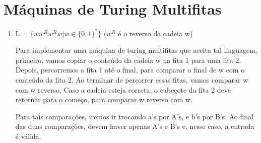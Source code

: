 \section{Máquinas de Turing Multifitas}

\begin{enumerate}[label=(\alph*)]

\item L = $\{ww^Rw^Rw \vert w \in \{0,1\}^*\}$  ($w^R$ é o reverso da cadeia w)

Para implementar uma máquina de turing multifitas que aceita tal linguagem, primeiro,
vamos copiar o conteúdo da cadeia w na fita 1 para uma fita 2. Depois,
percorremos a fita 1 até o final, para comparar o final de w com o conteúdo da fita 2. 
Ao terminar de percorrer essas fitas, vamos comparar w com w reverso. Caso a cadeia esteja
correta, o cabeçote da fita 2 deve retornar para o começo, para comparar w reverso com w.

Para tais comparações, iremos ir trocando a's por A's, e b's por B's. Ao final das duas comparações,
devem haver apenas A's e B's e, nesse caso, a entrada é válida.

\end{enumerate}